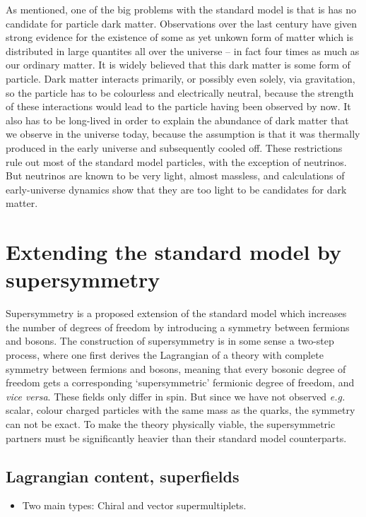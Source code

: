 \documentclass[twoside,english]{uiofysmaster}
\begin{document}
As mentioned, one of the big problems with the standard model is that is has no candidate for particle dark matter. Observations over the last century have given strong evidence for the existence of some as yet unkown form of matter which is distributed in large quantites all over the universe -- in fact four times as much as our ordinary matter. It is widely believed that this dark matter is some form of particle. Dark matter interacts primarily, or possibly even solely, via gravitation, so the particle has to be colourless and electrically neutral, because the strength of these interactions would lead to the particle having been observed by now. It also has to be long-lived in order to explain the abundance of dark matter that we observe in the universe today, because the assumption is that it was thermally produced in the early universe and subsequently cooled off. These restrictions rule out most of the standard model particles, with the exception of neutrinos. But neutrinos are known to be very light, almost massless, and calculations of early-universe dynamics show that they are too light to be candidates for dark matter. 

\section{Extending the standard model by supersymmetry}
Supersymmetry is a proposed extension of the standard model which increases the number of degrees of freedom by introducing a symmetry between fermions and bosons. The construction of supersymmetry is in some sense a two-step process, where one first derives the Lagrangian of a theory with complete symmetry between fermions and bosons, meaning that every bosonic degree of freedom gets a corresponding `supersymmetric' fermionic degree of freedom, and {\it vice versa}. These fields only differ in spin. But since we have not observed {\it e.g.\ } scalar, colour charged particles with the same mass as the quarks, the symmetry can not be exact. To make the theory physically viable, the supersymmetric partners must be significantly heavier than their standard model counterparts. 


\subsection{Lagrangian content, superfields}
\begin{itemize}
	\item Two main types: Chiral and vector supermultiplets.
\end{itemize}
\end{document}
